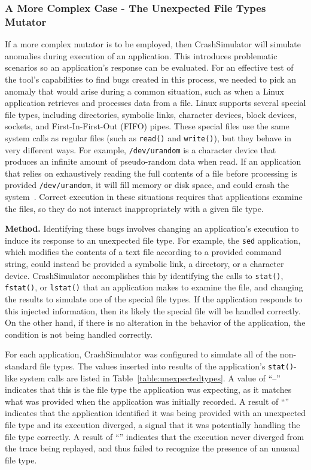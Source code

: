 \subsubsection{A More Complex Case - The Unexpected File Types Mutator}
\label{sec-file-type-bugs}

If a more complex mutator is to be employed, then
CrashSimulator will  simulate anomalies during execution
of an application.
This introduces problematic scenarios
so an application's response
can be evaluated.
For an effective test of the
tool's capabilities to find bugs created in this process,
we needed to pick an anomaly
that would arise during a common situation,
such as when a Linux application retrieves
and processes data from a file.
Linux supports
several special file types,
including
directories,
symbolic links,
character devices,
block devices,
sockets, and
First-In-First-Out (FIFO) pipes.
These special files
use the same system calls
as regular files
(such as {\tt read()} and {\tt write()}),
but they behave in very different ways.
For example,
{\tt /dev/urandom} is a character device
that produces an infinite amount
of pseudo-random data
when read.
If an application
that relies on exhaustively reading the full
contents of a file before processing is provided {\tt /dev/urandom}, it
will fill memory or disk space, and could
crash the system~\cite{YumAptEndless}.
Correct execution in these situations
requires that applications
examine the files, so they do not
interact inappropriately with a given file type.

{\bf Method.}
Identifying these bugs involves changing an application's
execution to induce its response to an unexpected file type. For
example, the {\tt sed} application, which modifies the contents of a text
file according to a provided command string, could instead be provided a symbolic
link, a directory, or a character device.  CrashSimulator
accomplishes this by identifying the calls to {\tt stat()}, {\tt fstat()},
or {\tt lstat()} that an application makes to examine the file, and
changing the results to simulate
one of the special file types.  If the application responds to
this injected information, then its likely the special
file will be handled correctly.  On the other hand, if there is no
alteration in the behavior of the application, the condition is not
being handled correctly.

For each application,
CrashSimulator was configured to simulate all of the non-standard file
types.
The values inserted into results of the application's {\tt stat()}-like
system calls are listed
in Table~\ref{table:unexpectedtypes}.
A value of ``--'' indicates
that this is the file type the application was expecting,
as it matches what was provided when the application was initially recorded.
A result of ``\tickmark'' indicates that the application
identified it was being provided with an unexpected file type and its
execution diverged, a signal that it was potentially handling the
file type correctly.
A result of ``\xmark'' indicates
that the execution never diverged from the trace being replayed,
and thus failed to recognize the presence of an unusual file type.

